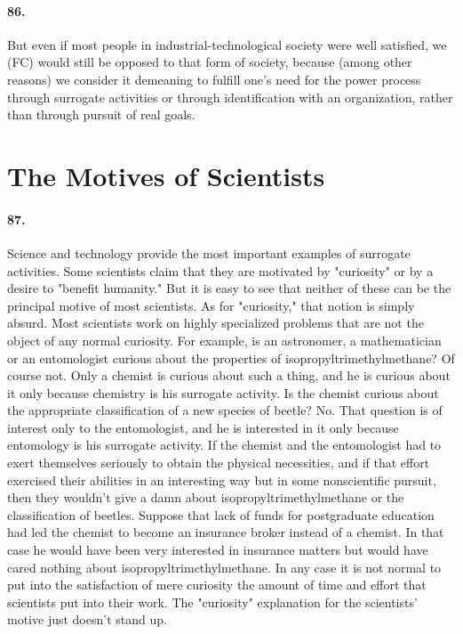 \documentclass[12pt]{book}
\newcommand{\mysection}[1]{\section*{#1} \addcontentsline{toc}{section}{#1}}
\begin{document}
\paragraph{86.} But even if most people in industrial-technological society were well satisfied, we (FC) would still be opposed to that form of society, because (among other reasons) we consider it demeaning to fulfill one's need for the power process through surrogate activities or through identification with an organization, rather than through pursuit of real goals.

\mysection{The Motives of Scientists}


\paragraph{87.} Science and technology provide the most important examples of surrogate activities. Some scientists claim that they are motivated by "curiosity" or by a desire to "benefit humanity." But it is easy to see that neither of these can be the principal motive of most scientists. As for "curiosity," that notion is simply absurd. Most scientists work on highly specialized problems that are not the object of any normal curiosity. For example, is an astronomer, a mathematician or an entomologist curious about the properties of isopropyltrimethylmethane? Of course not. Only a chemist is curious about such a thing, and he is curious about it only because chemistry is his surrogate activity. Is the chemist curious about the appropriate classification of a new species of beetle? No. That question is of interest only to the entomologist, and he is interested in it only because entomology is his surrogate activity. If the chemist and the entomologist had to exert themselves seriously to obtain the physical necessities, and if that effort exercised their abilities in an interesting way but in some nonscientific pursuit, then they wouldn't give a damn about isopropyltrimethylmethane or the classification of beetles. Suppose that lack of funds for postgraduate education had led the chemist to become an insurance broker instead of a chemist. In that case he would have been very interested in insurance matters but would have cared nothing about isopropyltrimcthylmethane. In any case it is not normal to put into the satisfaction of mere curiosity the amount of time and effort that scientists put into their work. The "curiosity" explanation for the scientists' motive just doesn't stand up.
\end{document}

